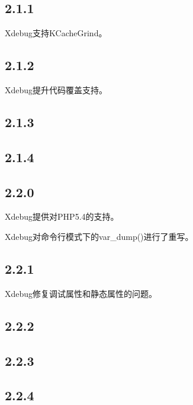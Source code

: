 \subsection{2.1.1}

\begin{compactitem}
\item Xdebug支持KCacheGrind。
\end{compactitem}


\subsection{2.1.2}

Xdebug提升代码覆盖支持。


\subsection{2.1.3}

\subsection{2.1.4}

\subsection{2.2.0}

\begin{compactitem}
\item Xdebug提供对PHP5.4的支持。
\item Xdebug对命令行模式下的var\_dump()进行了重写。
\end{compactitem}

\subsection{2.2.1}

Xdebug修复调试属性和静态属性的问题。

\subsection{2.2.2}

\subsection{2.2.3}


\subsection{2.2.4}


